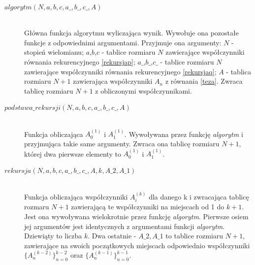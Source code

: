 \documentclass[a4paper]{article}
\begin{document}
\begin{description}
\item[$algorytm(N,a,b,c,a\_,b\_,c\_,A)$] \hfill\\ Główna funkcja algorytmu wyliczająca wynik. Wywołuje ona pozostałe funkcje z odpowiednimi argumentami. Przyjmuje ona argumenty: $N$ - stopień wielomianu; $a$,$b$,$c$ - tablice rozmiaru $N$ zawierające współczynniki równania rekurencyjnego \eqref{rekursjap}; $a\_$,$b\_$,$c\_$ - tablice rozmiaru $N$ zawierające współczynniki równania rekurencyjnego \eqref{rekursjaq}; $A$ - tablica rozmiaru $N+1$ zawierająca współczynniki $A_n$ z równania \eqref{teza}. Zwraca tablicę rozmiaru $N+1$ z obliczonymi współczynnikami.
\item[$podstawa\_rekursji(N,a,b,c,a\_,b\_,c\_,A)$] \hfill\\ Funkcja obliczająca $A_0^{(1)}$ i  $A_1^{(1)}$. Wywoływana przez funkcję \textit{algorytm} i przyjmująca takie same argumenty. Zwraca ona tablicę rozmiaru $N+1$, której dwa pierwsze elementy to $A_0^{(1)}$ i  $A_1^{(1)}$.
\item[$rekursja(N,a,b,c,a\_,b\_,c\_,A,k,A\_2,A\_1)$] \hfill\\ Funkcja obliczająca współczynniki $A_i^{(k)}$  dla danego k i zwracająca tablicę rozmaru $N+1$ zawierającą te współczynniki na miejscach od 1 do $k+1$. Jest ona wywoływana wielokrotnie przez funkcję \textit{algorytm}. Pierwsze osiem jej argumentów jest identycznych z argumentami funkcji \textit{algorytm}. Dziewiąty to liczba $k$. Dwa ostatnie - $A\_2,A\_1$ to tablice rozmiaru $N+1$, zawierające na swoich początkowych miejscach odpowiednio współczynniki $\{A_n^{(k-2)}\}_{n=0}^{k-2}$ oraz $\{A_n^{(k-1)}\}_{n=0}^{k-1}$.
\end{description}
\newpage
\end{document}
